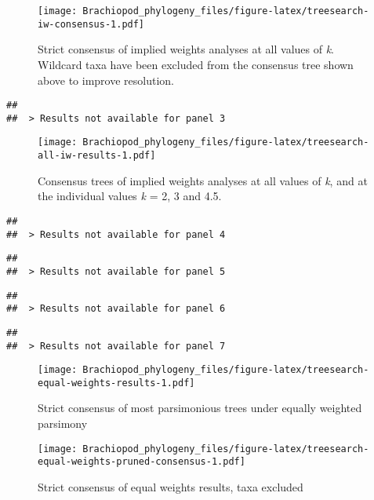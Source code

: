 \documentclass[openany]{book}
\theoremstyle{definition}
\theoremstyle{definition}
\theoremstyle{definition}
\theoremstyle{remark}
\begin{document}
\begin{figure}
\centering
\texttt{[image: Brachiopod\_phylogeny\_files/figure-latex/treesearch-iw-consensus-1.pdf]}
\caption{\label{fig:treesearch-iw-consensus}Strict consensus of implied weights analyses at all
values of \emph{k}. Wildcard taxa have been excluded from the consensus
tree shown above to improve resolution.}
\end{figure}








\clearpage 

\begin{verbatim}
## 
##  > Results not available for panel 3
\end{verbatim}

\begin{figure}
\centering
\texttt{[image: Brachiopod\_phylogeny\_files/figure-latex/treesearch-all-iw-results-1.pdf]}
\caption{\label{fig:treesearch-all-iw-results}Consensus trees of implied weights analyses
at all values of \emph{k}, and at the individual
values \emph{k} = 2, 3 and 4.5.}
\end{figure}

\clearpage 

\begin{verbatim}
## 
##  > Results not available for panel 4
\end{verbatim}

\begin{verbatim}
## 
##  > Results not available for panel 5
\end{verbatim}

\begin{verbatim}
## 
##  > Results not available for panel 6
\end{verbatim}

\begin{verbatim}
## 
##  > Results not available for panel 7
\end{verbatim}

\clearpage

\begin{figure}
\centering
\texttt{[image: Brachiopod\_phylogeny\_files/figure-latex/treesearch-equal-weights-results-1.pdf]}
\caption{\label{fig:treesearch-equal-weights-results}Strict consensus of
most parsimonious trees under equally weighted parsimony}
\end{figure}

\begin{figure}
\centering
\texttt{[image: Brachiopod\_phylogeny\_files/figure-latex/treesearch-equal-weights-pruned-consensus-1.pdf]}
\caption{\label{fig:treesearch-equal-weights-pruned-consensus}Strict
consensus of equal weights results, taxa excluded}
\end{figure}
\end{document}
